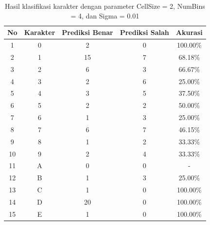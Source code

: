 \begin{longtable}[c]{|c|c|c|c|c|}
	\caption{Hasil klasifikasi karakter dengan parameter CellSize = 2, NumBins = 4, dan Sigma = 0.01}
	\label{tab:hasilklasifikasisel2}\\
	\hline
	\textbf{No} & \textbf{Karakter} & \textbf{Prediksi Benar} & \textbf{Prediksi Salah} & \textbf{Akurasi} \\ \hline
	\endhead
	1           & 0                 & 2                       & 0                       &100.00\%            \\ \hline
	2           & 1                 & 15                       & 7                       &68.18\%            \\ \hline
	3           & 2                 & 6                       & 3                       &66.67\%            \\ \hline
	4           & 3                 & 2                       & 6                       &25.00\%            \\ \hline
	5           & 4                 & 3                       & 5                       &37.50\%            \\ \hline
	6           & 5                 & 2                       & 2                       &50.00\%            \\ \hline
	7           & 6                 & 1                       & 3                       &25.00\%            \\ \hline
	8           & 7                 & 6                       & 7                       &46.15\%            \\ \hline
	9           & 8                 & 1                       & 2                       &33.33\%            \\ \hline
	10           & 9                 & 2                       & 4                       &33.33\%            \\ \hline
	11           & A                 & 0                       & 0                       & -            \\ \hline
	12           & B                 & 1                       & 3                       &25.00\%            \\ \hline
	13           & C                 & 1                       & 0                       &100.00\%            \\ \hline
	14           & D                 & 20                       & 0                       &100.00\%            \\ \hline
	15           & E                 & 1                       & 0                       &100.00\%            \\ \hline

\end{longtable}
